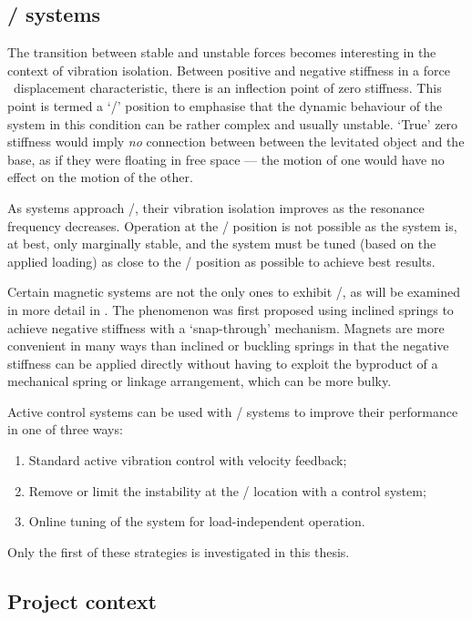 \documentclass[11pt,a4paper]{memoir}
\begin{document}
\subsection{\QZS/ systems}

The transition between stable and unstable forces becomes interesting in the context of vibration isolation.
Between positive and negative stiffness in a force \vs\ displacement characteristic, there is an inflection point of zero stiffness.
This point is termed a `\qzs/' position to emphasise that the dynamic behaviour of the system in this condition can be rather complex and usually unstable.
`True' zero stiffness would imply \emph{no} connection between between the levitated object and the base, as if they were floating in free space — the motion of one would have no effect on the motion of the other.

As systems approach \qzs/, their vibration isolation improves as the resonance frequency decreases.
Operation at the \qzs/ position is not possible as the system is, at best, only marginally stable, and the system must be tuned (based on the applied loading) as close to the \qzs/ position as possible to achieve best results.

Certain magnetic systems are not the only ones to exhibit \qzs/, as will be examined in more detail in .
The phenomenon was first proposed using inclined springs to achieve negative stiffness with a `snap-through' mechanism.
Magnets are more convenient in many ways than inclined or buckling springs in that the negative stiffness can be applied directly without having to exploit the byproduct of a mechanical spring or linkage arrangement, which can be more bulky.

Active control systems can be used with \qzs/ systems to improve their performance in one of three ways:
\begin{enumerate}
  \item Standard active vibration control with velocity feedback;
  \item Remove or limit the instability at the \qzs/ location with a control system;
  \item Online tuning of the system for load-independent operation.
\end{enumerate}
Only the first of these strategies is investigated in this thesis.


\subsection{Project context}
\end{document}
